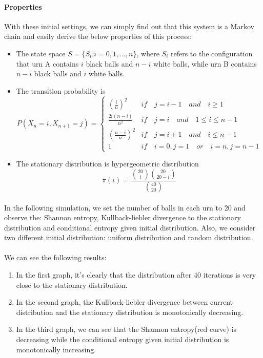 \documentclass[a4paper, 11pt]{article} %
\begin{document}
\paragraph{Properties}
With these initial settings, we can simply find out that this system is a Markov chain and easily derive the below properties of this process:
\begin{itemize}
\item The state space $S = \{S_i\vert i=0,1,...,n\}$, where $S_i$ refers to the configuration that urn A contains $i$ black balls and $n-i$ white balls, while urn B contains $n-i$ black balls and $i$ white balls.
\item The transition probability is
\begin{equation}
P(X_n = i,X_{n+1} = j) = \left\{
\begin{array}{lcl}
{(\frac{i}{n})^2} & if \quad j = i-1\quad and\quad i \geq 1 \\
{\frac{2i(n-i)}{n^2}} & if \quad j = i\quad and\quad 1 \leq i \leq n-1 \\
{(\frac{n-i}{n})^2} & if \quad j = i+1 \quad and \quad i\leq n-1 \\
{1} & if \quad i=0, j=1 \quad or \quad i=n,j=n-1
\end{array} 
\right.
\end{equation}

\item The stationary distribution is hypergeometric distribution
\begin{equation}
\pi(i)=\frac{{20 \choose i}{20 \choose 20-i}}{{40 \choose20}}
\end{equation} 
\end{itemize}

\paragraph{}
In the following simulation, we set the number of balls in each urn to $20$ and observe the: Shannon entropy, Kullback-liebler divergence  to the stationary distribution and conditional entropy given initial distribution.
\hspace*{2mm} Also, we consider two different initial distribution: uniform  distribution and random  distribution.

\paragraph{}
We can see the following results:
\begin{enumerate}
\item In the first graph, it's clearly that the distribution after 40 iterations is very close to the stationary distribution.
\item In the second graph, the Kullback-liebler divergence  between current distribution and the stationary distribution is monotonically decreasing.
\item In the third graph, we can see that the Shannon entropy(red curve) is decreasing while the conditional entropy given initial distribution is monotonically increasing.
\end{enumerate}
\end{document}
